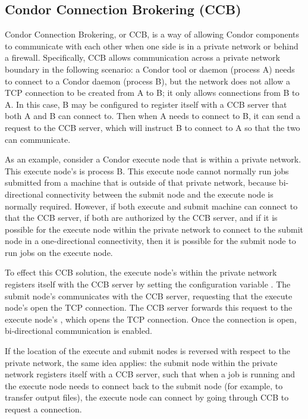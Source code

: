 \subsection{\label{sec:CCB}Condor Connection Brokering (CCB)}

Condor Connection Brokering, or CCB, is a way of allowing Condor
components to communicate with each other when one side is in a
private network or behind a firewall.  Specifically, CCB allows
communication across a private network boundary in the following
scenario: a Condor tool or daemon (process A) needs to connect to a
Condor daemon (process B), but the network does not allow a TCP
connection to be created from A to B; it only allows connections from
B to A.  In this case, B may be configured
to register itself with a CCB server that both A and B can connect to.
Then when A needs to connect to B, it can send a request to the CCB
server, which will instruct B to connect to A so that the two can
communicate.

As an example, consider a Condor execute node that is within
a private network. 
This execute node's  is process B.
This execute node cannot normally run jobs submitted from a machine
that is outside of that private network, 
because bi-directional connectivity between the submit node and the
execute node is normally required.  
However, 
if both execute and submit machine can connect to that the CCB server,
if both are authorized by the CCB server,
and if it is possible for the execute node within the private network
to connect to the submit node in a one-directional connectivity,
then it is possible for the submit node to run jobs on the
execute node.

To effect this CCB solution,
the execute node's  within the private network
registers itself with the CCB
server by setting the configuration variable .
The submit node's  communicates with the CCB server,
requesting that the execute node's  open the TCP
connection.
The CCB server forwards this request to the execute node's ,
which opens the TCP connection.
Once the connection is open, bi-directional communication is enabled.

If the location of the execute and submit nodes is reversed 
with respect to the private network,
the same idea applies:
the submit node within the private network registers itself with a CCB server,
such that when a job is running and the execute node needs to connect back to
the submit node (for example, to transfer output files), 
the execute node can connect by going through CCB to request a connection.

